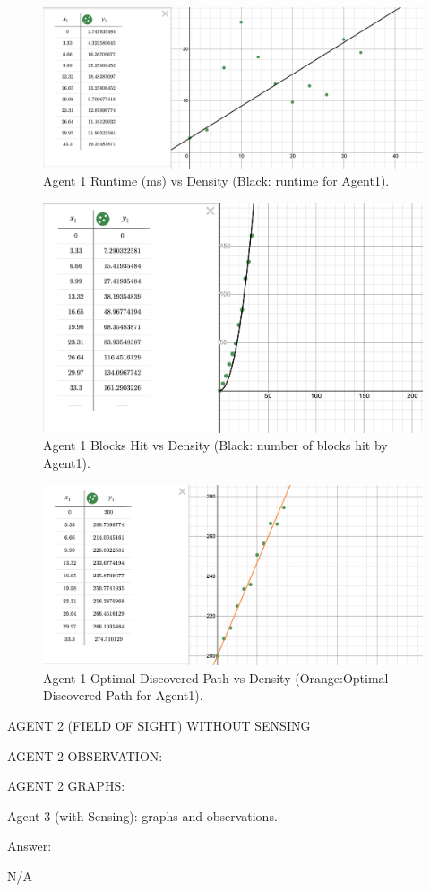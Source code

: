 \documentclass{homeworg}
\begin{document}
\begin{figure}[!htb]
  	\centering
  	\includegraphics*[scale=0.3]{Agent1.time.png}
	\caption{Agent 1 Runtime (ms) vs Density (Black: runtime for Agent1).}
	\label{fig:example}
\end{figure}

\begin{figure}[!htb]
  	\centering
  	\includegraphics*[scale=0.3]{Agent1.blocks.png}
	\caption{Agent 1 Blocks Hit vs Density (Black: number of blocks hit by Agent1).}
	\label{fig:example}
\end{figure}

\begin{figure}[!htb]
  	\centering
  	\includegraphics*[scale=0.3]{Agent1.opt.png}
	\caption{Agent 1 Optimal Discovered Path vs Density (Orange:Optimal Discovered Path for Agent1).}
	\label{fig:example}
\end{figure}

\newpage
\exercise*
AGENT 2 (FIELD OF SIGHT) WITHOUT SENSING

AGENT 2 OBSERVATION:

AGENT 2 GRAPHS:


\newpage
\exercise*
Agent 3 (with Sensing): graphs and observations.

Answer:

N/A
\end{document}
